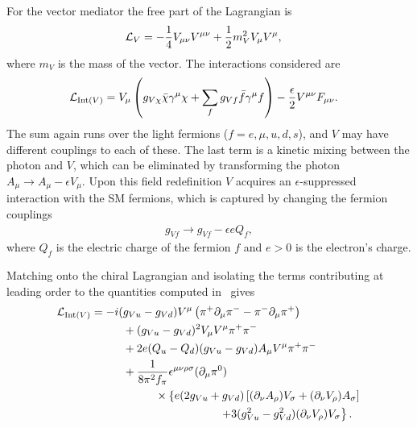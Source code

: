 \subsubsection{\vm}

For the vector mediator the free part of the Lagrangian is
\begin{align}
    \mathcal{L}_V &= -\frac{1}{4} V_{\mu\nu} V^{\mu\nu} + \frac{1}{2} m_V^2 V_\mu V^\mu,
\end{align}
where $m_V$ is the mass of the vector. The interactions considered are
\begin{align}
    \mathcal{L}_{{\mathrm{Int}}(V)} &= V_\mu \left( g_{V\chi} \bar{\chi} \gamma^\mu \chi + \sum_f g_{Vf} \bar{f} \gamma^\mu f \right) - \frac{\epsilon}{2} V^{\mu\nu} F_{\mu\nu}.
\end{align}
The sum again runs over the light fermions ($f = e, \mu, u, d, s$), and $V$ may have different couplings to each of these. The last term is a kinetic mixing between the photon and $V$, which can be eliminated by transforming the photon $A_\mu \to A_\mu - \epsilon V_\mu$. Upon this field redefinition $V$ acquires an $\epsilon$-suppressed interaction with the SM fermions, which is captured by changing the fermion couplings
\begin{align}
    g_{Vf} \to g_{Vf} - \epsilon e Q_f,
\end{align}
where $Q_f$ is the electric charge of the fermion $f$ and $e > 0$ is the electron's charge.

Matching onto the chiral Lagrangian and isolating the terms contributing at leading order to the quantities computed in \hazma\ gives
\begin{align}
    \L_{\mathrm{Int}(V)} &= -i (g_{Vu} - g_{Vd}) V^\mu \left( \pi^+ \d_\mu \pi^- - \pi^- \d_\mu \pi^+ \right)\\
                         &\hspace{1cm} + ( g_{Vu} - g_{Vd} )^2 V_\mu V^\mu \pi^+ \pi^-\\
                         &\hspace{1cm} + 2 e (Q_u - Q_d) (g_{Vu} - g_{Vd}) A_\mu V^\mu \pi^+ \pi^-\\
                         &\hspace{1cm} + \frac{1}{8\pi^2 f_\pi} \epsilon^{\mu\nu\rho\sigma} (\d_\mu \pi^0)\\
                         &\hspace{2cm} \times \left\{ e (2 g_{Vu} + g_{Vd}) \left[ (\d_\nu A_\rho) V_\sigma + (\d_\nu V_\rho) A_\sigma \right] \right.\\
                         &\hspace{4cm} \left. + 3 (g_{Vu}^2 - g_{Vd}^2) (\d_\nu V_\rho) V_\sigma \right\}.
\end{align} 

